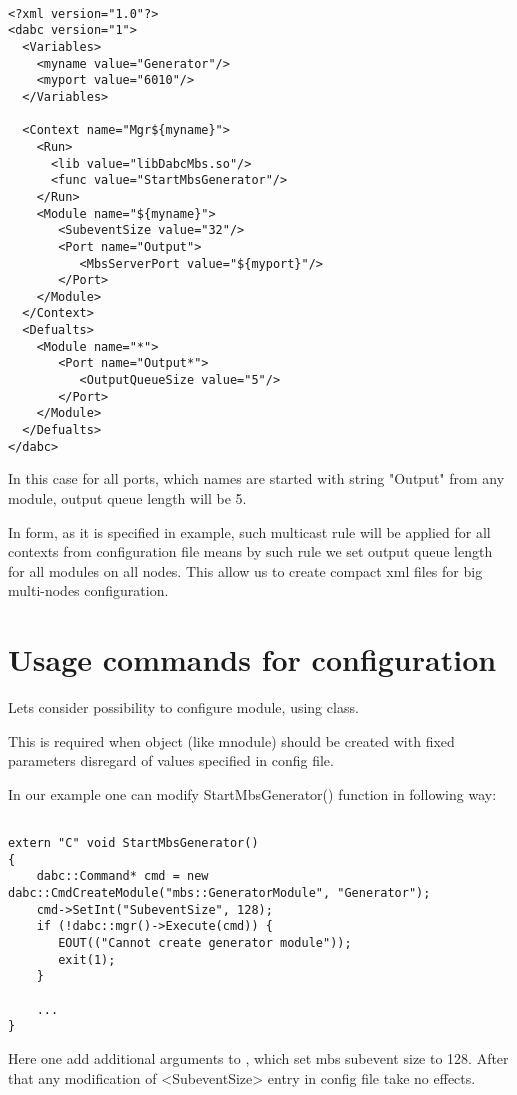 \begin{verbatim}

<?xml version="1.0"?>
<dabc version="1">
  <Variables>
    <myname value="Generator"/> 
    <myport value="6010"/> 
  </Variables>

  <Context name="Mgr${myname}">
    <Run>
      <lib value="libDabcMbs.so"/>
      <func value="StartMbsGenerator"/>
    </Run>
    <Module name="${myname}">
       <SubeventSize value="32"/>
       <Port name="Output">
          <MbsServerPort value="${myport}"/>
       </Port>
    </Module>
  </Context>
  <Defualts>
    <Module name="*">
       <Port name="Output*">
          <OutputQueueSize value="5"/>
       </Port>
    </Module>
  </Defualts>
</dabc>

\end{verbatim}

In this case for all ports, which names are started with string "Output" from any module,
output queue length will be 5. 

In form, as it is specified in example, such multicast rule will be applied for 
all contexts from configuration file means by such rule we set output queue length 
for all modules on all nodes. This allow us to create compact xml files for big multi-nodes configuration.   


\section{Usage commands for configuration}

Lets consider possibility to configure module, using  class.

This is required when object (like mnodule) should be created with fixed parameters
disregard of values specified in config file.

In our example one can modify StartMbsGenerator() function in following way:

\begin{verbatim}

extern "C" void StartMbsGenerator() 
{
    dabc::Command* cmd = new dabc::CmdCreateModule("mbs::GeneratorModule", "Generator");
    cmd->SetInt("SubeventSize", 128);
    if (!dabc::mgr()->Execute(cmd)) {
       EOUT(("Cannot create generator module"));
       exit(1);
    }
    
    ...
}
\end{verbatim}

Here one add additional arguments to , 
which set mbs subevent size to 128. After that any modification of
<SubeventSize> entry in config file take no effects.

